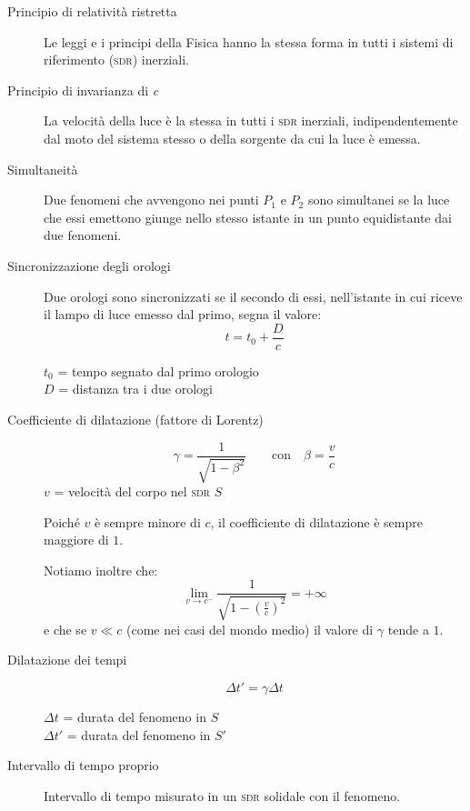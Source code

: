 \documentclass[a4paper,11pt,italian]{article}
\begin{document}
\begin{description}
  \item[Principio di relatività ristretta]
  Le leggi e i principi della Fisica hanno la stessa forma in tutti i sistemi di riferimento (\textsc{sdr}) inerziali.
  
  \item[Principio di invarianza di \textit{c}]
  La velocità della luce è la stessa in tutti i \textsc{sdr} inerziali, indipendentemente dal moto del sistema stesso o della sorgente da cui la luce è emessa.
  
  \item[Simultaneità]
  Due fenomeni che avvengono nei punti $ P_1 $ e $ P_2 $ sono simultanei se la luce che essi emettono giunge nello stesso istante in un punto equidistante dai due fenomeni.
  
  \item[Sincronizzazione degli orologi]
  Due orologi sono sincronizzati se il secondo di essi, nell'istante in cui riceve il lampo di luce emesso dal primo, segna il valore:
  \[ t = t_0 + \frac{D}{c} \]
  \begin{multicols}{2}
  $ t_0 $ = tempo segnato dal primo orologio\\
  $ D $ = distanza tra i due orologi
  \end{multicols}
  
  \item[Coefficiente di dilatazione (fattore di Lorentz)]
  \[ \gamma = \frac{1}{\sqrt{1-\beta^2}} \qquad \mathrm{con} \quad \beta = \frac{v}{c} \]
  $ v $ = velocità del corpo nel \textsc{sdr} $ S $
  
  Poiché $ v $ è sempre minore di $ c $, il coefficiente di dilatazione è sempre maggiore di $ 1 $.

  Notiamo inoltre che:
  \[ \lim_{v \rightarrow c^{-}} \frac{1}{\sqrt{1-(\frac{v}{c})^2}} = + \infty \]
  e che se $ v \ll c $ (come nei casi del mondo medio) il valore di $ \gamma $ tende a $ 1 $.
  
  \item[Dilatazione dei tempi]
  \[ \Delta t' = \gamma \Delta t \]
  \begin{multicols}{2}
  $ \Delta t $ = durata del fenomeno in $ S $\\
  $ \Delta t' $ = durata del fenomeno in $ S' $
  \end{multicols}
  
  \item[Intervallo di tempo proprio]
  Intervallo di tempo misurato in un \textsc{sdr} solidale con il fenomeno.
  

\end{description}
\end{document}
